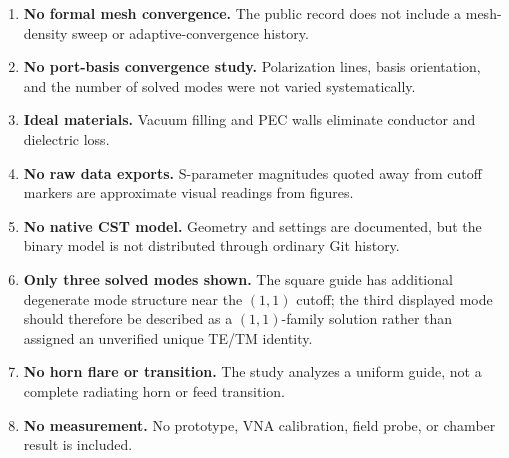 \begin{enumerate}
  \item \textbf{No formal mesh convergence.} The public record does not include a mesh-density sweep or adaptive-convergence history.
  \item \textbf{No port-basis convergence study.} Polarization lines, basis orientation, and the number of solved modes were not varied systematically.
  \item \textbf{Ideal materials.} Vacuum filling and PEC walls eliminate conductor and dielectric loss.
  \item \textbf{No raw data exports.} S-parameter magnitudes quoted away from cutoff markers are approximate visual readings from figures.
  \item \textbf{No native CST model.} Geometry and settings are documented, but the binary model is not distributed through ordinary Git history.
  \item \textbf{Only three solved modes shown.} The square guide has additional degenerate mode structure near the \((1,1)\) cutoff; the third displayed mode should therefore be described as a \((1,1)\)-family solution rather than assigned an unverified unique TE/TM identity.
  \item \textbf{No horn flare or transition.} The study analyzes a uniform guide, not a complete radiating horn or feed transition.
  \item \textbf{No measurement.} No prototype, VNA calibration, field probe, or chamber result is included.
\end{enumerate}
